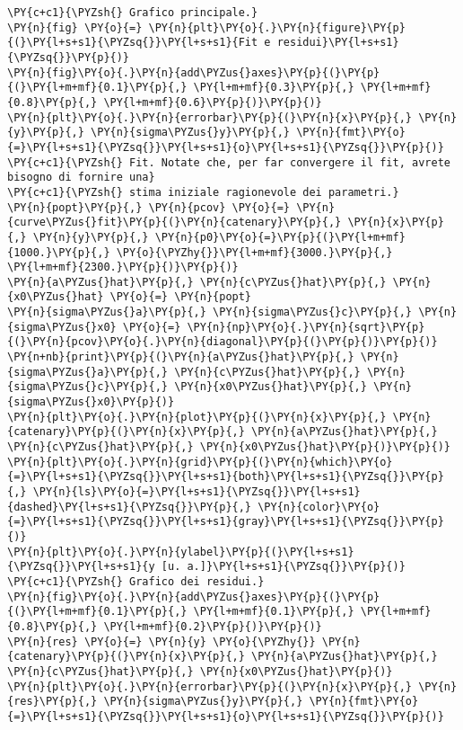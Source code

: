\begin{Verbatim}[label=\makebox{\href{https://github.com/unipi-physics-labs/lab1-sheets/tree/main/snippy/dad_catenaria.py}{https://github.com/.../dad\_catenaria.py}},commandchars=\\\{\}]
\PY{c+c1}{\PYZsh{} Grafico principale.}
\PY{n}{fig} \PY{o}{=} \PY{n}{plt}\PY{o}{.}\PY{n}{figure}\PY{p}{(}\PY{l+s+s1}{\PYZsq{}}\PY{l+s+s1}{Fit e residui}\PY{l+s+s1}{\PYZsq{}}\PY{p}{)}
\PY{n}{fig}\PY{o}{.}\PY{n}{add\PYZus{}axes}\PY{p}{(}\PY{p}{(}\PY{l+m+mf}{0.1}\PY{p}{,} \PY{l+m+mf}{0.3}\PY{p}{,} \PY{l+m+mf}{0.8}\PY{p}{,} \PY{l+m+mf}{0.6}\PY{p}{)}\PY{p}{)}
\PY{n}{plt}\PY{o}{.}\PY{n}{errorbar}\PY{p}{(}\PY{n}{x}\PY{p}{,} \PY{n}{y}\PY{p}{,} \PY{n}{sigma\PYZus{}y}\PY{p}{,} \PY{n}{fmt}\PY{o}{=}\PY{l+s+s1}{\PYZsq{}}\PY{l+s+s1}{o}\PY{l+s+s1}{\PYZsq{}}\PY{p}{)}
\PY{c+c1}{\PYZsh{} Fit. Notate che, per far convergere il fit, avrete bisogno di fornire una}
\PY{c+c1}{\PYZsh{} stima iniziale ragionevole dei parametri.}
\PY{n}{popt}\PY{p}{,} \PY{n}{pcov} \PY{o}{=} \PY{n}{curve\PYZus{}fit}\PY{p}{(}\PY{n}{catenary}\PY{p}{,} \PY{n}{x}\PY{p}{,} \PY{n}{y}\PY{p}{,} \PY{n}{p0}\PY{o}{=}\PY{p}{(}\PY{l+m+mf}{1000.}\PY{p}{,} \PY{o}{\PYZhy{}}\PY{l+m+mf}{3000.}\PY{p}{,} \PY{l+m+mf}{2300.}\PY{p}{)}\PY{p}{)}
\PY{n}{a\PYZus{}hat}\PY{p}{,} \PY{n}{c\PYZus{}hat}\PY{p}{,} \PY{n}{x0\PYZus{}hat} \PY{o}{=} \PY{n}{popt}
\PY{n}{sigma\PYZus{}a}\PY{p}{,} \PY{n}{sigma\PYZus{}c}\PY{p}{,} \PY{n}{sigma\PYZus{}x0} \PY{o}{=} \PY{n}{np}\PY{o}{.}\PY{n}{sqrt}\PY{p}{(}\PY{n}{pcov}\PY{o}{.}\PY{n}{diagonal}\PY{p}{(}\PY{p}{)}\PY{p}{)}
\PY{n+nb}{print}\PY{p}{(}\PY{n}{a\PYZus{}hat}\PY{p}{,} \PY{n}{sigma\PYZus{}a}\PY{p}{,} \PY{n}{c\PYZus{}hat}\PY{p}{,} \PY{n}{sigma\PYZus{}c}\PY{p}{,} \PY{n}{x0\PYZus{}hat}\PY{p}{,} \PY{n}{sigma\PYZus{}x0}\PY{p}{)}
\PY{n}{plt}\PY{o}{.}\PY{n}{plot}\PY{p}{(}\PY{n}{x}\PY{p}{,} \PY{n}{catenary}\PY{p}{(}\PY{n}{x}\PY{p}{,} \PY{n}{a\PYZus{}hat}\PY{p}{,} \PY{n}{c\PYZus{}hat}\PY{p}{,} \PY{n}{x0\PYZus{}hat}\PY{p}{)}\PY{p}{)}
\PY{n}{plt}\PY{o}{.}\PY{n}{grid}\PY{p}{(}\PY{n}{which}\PY{o}{=}\PY{l+s+s1}{\PYZsq{}}\PY{l+s+s1}{both}\PY{l+s+s1}{\PYZsq{}}\PY{p}{,} \PY{n}{ls}\PY{o}{=}\PY{l+s+s1}{\PYZsq{}}\PY{l+s+s1}{dashed}\PY{l+s+s1}{\PYZsq{}}\PY{p}{,} \PY{n}{color}\PY{o}{=}\PY{l+s+s1}{\PYZsq{}}\PY{l+s+s1}{gray}\PY{l+s+s1}{\PYZsq{}}\PY{p}{)}
\PY{n}{plt}\PY{o}{.}\PY{n}{ylabel}\PY{p}{(}\PY{l+s+s1}{\PYZsq{}}\PY{l+s+s1}{y [u. a.]}\PY{l+s+s1}{\PYZsq{}}\PY{p}{)}
\PY{c+c1}{\PYZsh{} Grafico dei residui.}
\PY{n}{fig}\PY{o}{.}\PY{n}{add\PYZus{}axes}\PY{p}{(}\PY{p}{(}\PY{l+m+mf}{0.1}\PY{p}{,} \PY{l+m+mf}{0.1}\PY{p}{,} \PY{l+m+mf}{0.8}\PY{p}{,} \PY{l+m+mf}{0.2}\PY{p}{)}\PY{p}{)}
\PY{n}{res} \PY{o}{=} \PY{n}{y} \PY{o}{\PYZhy{}} \PY{n}{catenary}\PY{p}{(}\PY{n}{x}\PY{p}{,} \PY{n}{a\PYZus{}hat}\PY{p}{,} \PY{n}{c\PYZus{}hat}\PY{p}{,} \PY{n}{x0\PYZus{}hat}\PY{p}{)}
\PY{n}{plt}\PY{o}{.}\PY{n}{errorbar}\PY{p}{(}\PY{n}{x}\PY{p}{,} \PY{n}{res}\PY{p}{,} \PY{n}{sigma\PYZus{}y}\PY{p}{,} \PY{n}{fmt}\PY{o}{=}\PY{l+s+s1}{\PYZsq{}}\PY{l+s+s1}{o}\PY{l+s+s1}{\PYZsq{}}\PY{p}{)}

\end{Verbatim}
